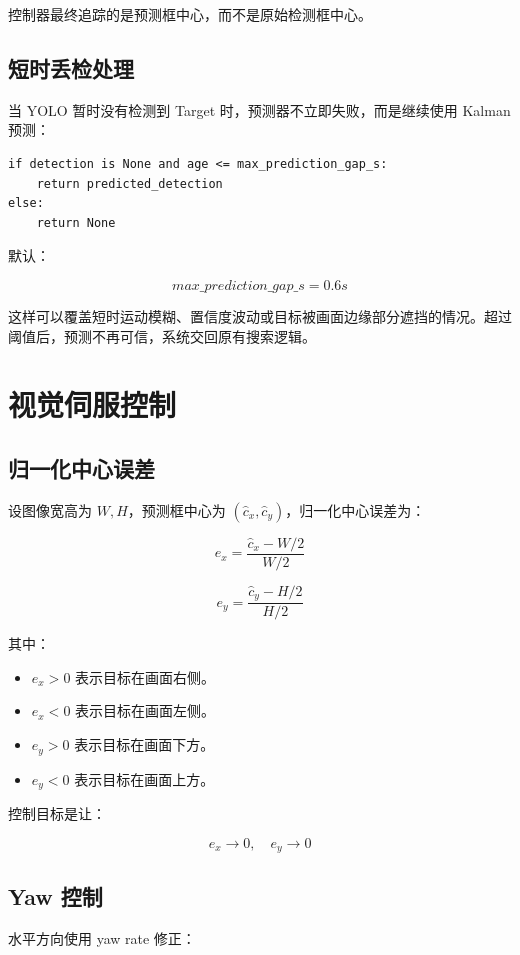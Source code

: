 \documentclass[UTF8,a4paper,11pt]{ctexart}
\begin{document}
控制器最终追踪的是预测框中心，而不是原始检测框中心。

\subsection{短时丢检处理}

当 YOLO 暂时没有检测到 Target 时，预测器不立即失败，而是继续使用 Kalman 预测：

\begin{lstlisting}
if detection is None and age <= max_prediction_gap_s:
    return predicted_detection
else:
    return None
\end{lstlisting}

默认：

\[
max\_prediction\_gap\_s=0.6s
\]

这样可以覆盖短时运动模糊、置信度波动或目标被画面边缘部分遮挡的情况。超过阈值后，预测不再可信，系统交回原有搜索逻辑。

\section{视觉伺服控制}

\subsection{归一化中心误差}

设图像宽高为 $W,H$，预测框中心为 $(\hat{c}_x,\hat{c}_y)$，归一化中心误差为：

\[
e_x=\frac{\hat{c}_x-W/2}{W/2}
\]

\[
e_y=\frac{\hat{c}_y-H/2}{H/2}
\]

其中：

\begin{itemize}
  \item $e_x>0$ 表示目标在画面右侧。
  \item $e_x<0$ 表示目标在画面左侧。
  \item $e_y>0$ 表示目标在画面下方。
  \item $e_y<0$ 表示目标在画面上方。
\end{itemize}

控制目标是让：

\[
e_x \rightarrow 0,\quad e_y \rightarrow 0
\]

\subsection{Yaw 控制}

水平方向使用 yaw rate 修正：
\end{document}
